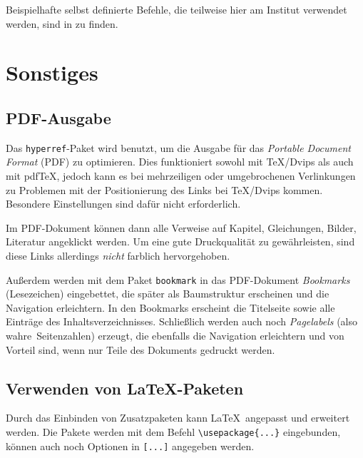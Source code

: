 Beispielhafte selbst definierte Befehle, die teilweise hier am Institut verwendet werden, sind in  zu finden.

\section{Sonstiges}
\subsection*{PDF-Ausgabe}
Das \verb|hyperref|-Paket wird benutzt, um  die Ausgabe für das \emph{Portable Document Format} (PDF) zu optimieren.
Dies funktioniert sowohl mit \TeX/Dvips als auch mit pdf\TeX, jedoch kann es bei mehrzeiligen oder umgebrochenen Verlinkungen zu Problemen mit der Positionierung des Links bei \TeX/Dvips kommen.
Besondere Einstellungen sind dafür nicht erforderlich.

Im PDF-Dokument können dann alle Verweise auf Kapitel, Gleichungen, Bilder, Literatur \usw angeklickt werden.
Um eine gute Druckqualität zu gewährleisten, sind diese Links allerdings \emph{nicht} farblich hervorgehoben.

Außerdem werden mit dem Paket \texttt{bookmark} in das PDF-Dokument \emph{Bookmarks} (Lesezeichen) eingebettet, die später als Baumstruktur erscheinen und die Navigation erleichtern.
In den Bookmarks erscheint die Titelseite sowie alle Einträge des Inhaltsverzeichnisses.
Schließlich werden auch noch \emph{Pagelabels} (also \glqq wahre\grqq\ Seitenzahlen) erzeugt, die ebenfalls die Navigation erleichtern und von Vorteil sind, wenn nur Teile des Dokuments gedruckt werden.


\subsection*{Verwenden von \LaTeX-Paketen}
Durch das Einbinden von Zusatzpaketen kann \LaTeX\ angepasst und erweitert werden.
Die Pakete werden mit dem Befehl \verb|\usepackage{...}| eingebunden, \ggf können auch noch Optionen in \verb|[...]| angegeben werden.


